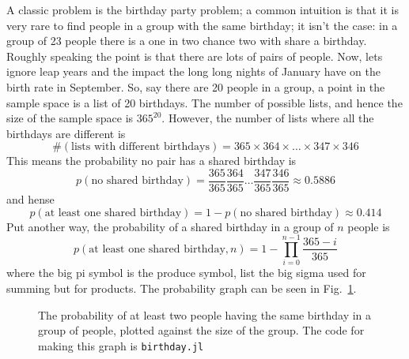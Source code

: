 \documentclass[11pt,a4paper]{scrartcl}
\begin{document}
A classic problem is the birthday party problem; a common intuition is
that it is very rare to find people in a group with the same birthday;
it isn't the case: in a group of 23 people there is a one in two
chance two with share a birthday. Roughly speaking the point is that
there are lots of pairs of people. Now, lets ignore leap years and the
impact the long long nights of January have on the birth rate in
September. So, say there are 20 people in a
group, a point in the sample space is a list of 20 birthdays. The
number of possible lists, and hence the size of the sample space is
$365^{20}$. However, the number of lists where all the birthdays are
different is
\begin{equation}
\#(\mbox{lists with different birthdays})=365\times 364 \times \ldots \times 347 \times 346
\end{equation}
This means the probability no pair has a shared birthday is
\begin{equation}
p(\mbox{no shared birthday})=\frac{365}{365}\frac{364}{365}\ldots\frac{347}{365}\frac{346}{365}\approx 0.5886
\end{equation}
and hense
\begin{equation}
p(\mbox{at least one shared birthday})=1-p(\mbox{no shared birthday})\approx 0.414
\end{equation}
Put another way, the probability of a shared birthday in a group of $n$ people is
\begin{equation}
p(\mbox{at least one shared birthday},n)=1-\prod_{i=0}^{n-1}\frac{365-i}{365}
\end{equation}
where the big pi symbol is the produce symbol, list the big sigma used
for summing but for products. The probability graph can be seen in Fig.~\ref{fig_birthday}.


\begin{figure}[thb]
\begin{center}

\end{center}
\caption{The probability of at least two people having the same birthday in a group of people, plotted against the size of the group. The code for making this graph is \texttt{birthday.jl}\label{fig_birthday}}
\end{figure}
\end{document}
